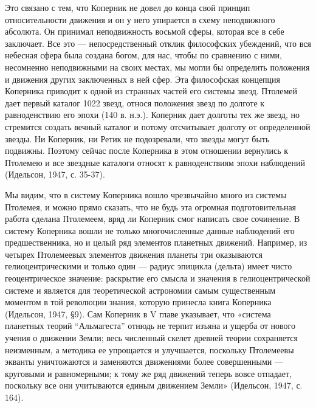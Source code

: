 Это связано с тем, что Коперник не довел до конца свой принцип
относительности движения и он у него упирается в схему неподвижного
абсолюта. Он принимал неподвижность восьмой сферы, которая все в себе
заключает. Все это --- непосредственный отклик философских убеждений,
что вся небесная сфера была создана богом, для нас, чтобы по сравнению
с ними, несомненно неподвижными на своих местах, мы могли бы
определить положения и движения других заключенных в ней сфер. Эта
философская концепция Коперника приводит к одной из странных частей
его системы звезд. Птолемей дает первый каталог 1022 звезд, относя
положения звезд по долготе к равноденствию его эпохи (140 в. н.э.).
Коперник дает долготы тех же звезд, но стремится создать вечный
каталог и потому отсчитывает долготу от определенной звезды. Ни
Коперник, ни Ретик не подозревали, что звезды могут быть подвижны.
Поэтому сейчас после Коперника в этом отношении вернулись к Птолемею и
все звездные каталоги относят к равноденствиям эпохи наблюдений
(Идельсон, 1947, с. 35-37).

Мы видим, что в систему Коперника вошло чрезвычайно много из системы
Птолемея, и можно прямо сказать, что не будь эта огромная
подготовительная работа сделана Птолемеем, вряд ли Коперник смог
написать свое сочинение. В систему Коперника вошли не только
многочисленные данные наблюдений его предшественника, но и целый ряд
элементов планетных движений. Например, из четырех Птолемеевых
элементов движения планеты три оказываются гелиоцентрическими и только
один --- радиус эпицикла (дельта) имеет чисто геоцентрическое
значение: раскрытие его смысла и значения в гелиоцентрической системе
и является для теоретической астрономии самым существенным моментом в
той революции знания, которую принесла книга Коперника (Идельсон,
1947, §9). Сам Коперник в V главе указывает, что «система планетных
теорий ``Альмагеста'' отнюдь не терпит изъяна и ущерба от нового
учения о движении Земли; весь численный скелет древней теории
сохраняется неизменным, а методика ее упрощается и улучшается,
поскольку Птолемеевы экванты уничтожаются и заменяются движениями
более совершенными --- круговыми и равномерными; к тому же ряд
движений теперь вовсе отпадает, поскольку все они учитываются единым
движением Земли» (Идельсон, 1947, с. 164).

